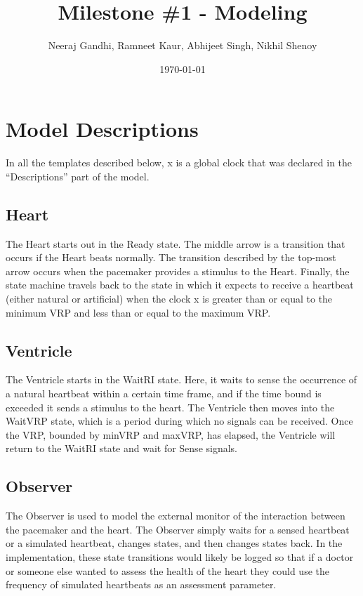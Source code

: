 \documentclass[10pt]{article}
\begin{document}
\title{\vspace{-2.0cm}Milestone \#1 - Modeling}
\author{Neeraj Gandhi, Ramneet Kaur, Abhijeet Singh, Nikhil Shenoy}
\date{\today}

\maketitle

\section{Model Descriptions}
	In all the templates described below, x is a global clock that was declared in the “Descriptions” part of the model.

	\subsection{Heart}
  
	The Heart starts out in the Ready state. The middle arrow is a transition that occurs if the Heart beats normally. The transition described by the top-most arrow occurs when the pacemaker provides a stimulus to the Heart. Finally, the state machine travels back to the state in which it expects to receive a heartbeat (either natural or artificial) when the clock x is greater than or equal to the minimum VRP and less than or equal to the maximum VRP.


	\subsection{Ventricle}

	The Ventricle starts in the WaitRI state. Here, it waits to sense the occurrence of a natural heartbeat within a certain time frame, and if the time bound is exceeded it sends a stimulus to the heart. The Ventricle then moves into the WaitVRP state, which is a period during which no signals can be received. Once the VRP, bounded by minVRP and maxVRP, has elapsed, the Ventricle will return to the WaitRI state and wait for Sense signals.


	\subsection{Observer}

	The Observer is used to model the external monitor of the interaction between the pacemaker and the heart. The Observer simply waits for a sensed heartbeat or a simulated heartbeat, changes states, and then changes states back. In the implementation, these state transitions would likely be logged so that if a doctor or someone else wanted to assess the health of the heart they could use the frequency of simulated heartbeats as an assessment parameter.
\end{document}
